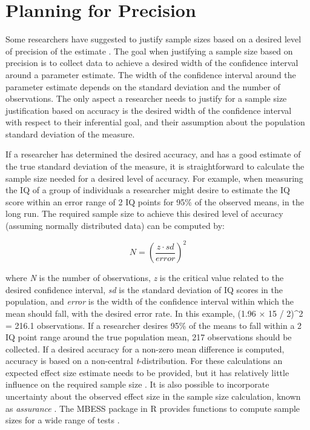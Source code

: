 \documentclass[
  oneside]{book}
\begin{document}
\hypertarget{planning-for-precision}{%
\section{Planning for Precision}\label{planning-for-precision}}

Some researchers have suggested to justify sample sizes based on a desired level of precision of the estimate \citep{cumming_introduction_2016, maxwell_sample_2008, kruschke_rejecting_2018}. The goal when justifying a sample size based on precision is to collect data to achieve a desired width of the confidence interval around a parameter estimate. The width of the confidence interval around the parameter estimate depends on the standard deviation and the number of observations. The only aspect a researcher needs to justify for a sample size justification based on accuracy is the desired width of the confidence interval with respect to their inferential goal, and their assumption about the population standard deviation of the measure.

If a researcher has determined the desired accuracy, and has a good estimate of the true standard deviation of the measure, it is straightforward to calculate the sample size needed for a desired level of accuracy. For example, when measuring the IQ of a group of individuals a researcher might desire to estimate the IQ score within an error range of 2 IQ points for 95\% of the observed means, in the long run. The required sample size to achieve this desired level of accuracy (assuming normally distributed data) can be computed by:

\[N = \left(\frac{z \cdot sd}{error}\right)^2\]

where \emph{N} is the number of observations, \emph{z} is the critical value related to the desired confidence interval, \emph{sd} is the standard deviation of IQ scores in the population, and \emph{error} is the width of the confidence interval within which the mean should fall, with the desired error rate. In this example, (1.96 × 15 / 2)\^{}2 = 216.1 observations. If a researcher desires 95\% of the means to fall within a 2 IQ point range around the true population mean, 217 observations should be collected. If a desired accuracy for a non-zero mean difference is computed, accuracy is based on a non-central \emph{t}-distribution. For these calculations an expected effect size estimate needs to be provided, but it has relatively little influence on the required sample size \citep{maxwell_sample_2008}. It is also possible to incorporate uncertainty about the observed effect size in the sample size calculation, known as \emph{assurance} \citep{kelley_sample_2006}. The MBESS package in R provides functions to compute sample sizes for a wide range of tests \citep{kelley_confidence_2007}.
\end{document}
